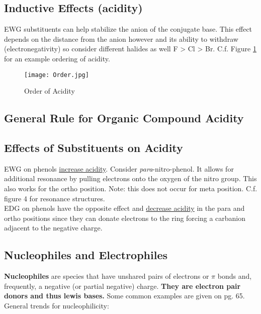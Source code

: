 \documentclass[../OChemReview.tex]{subfiles}
\begin{document}
  \subsection{Inductive Effects (acidity)}

  EWG substituents can help stabilize the anion of the conjugate base. This
  effect depends on the distance from the anion however and its ability to
  withdraw (electronegativity) so consider different halides as well F > Cl >
  Br. C.f. Figure \ref{fig:order} for an example ordering of acidity.
  \begin{figure}[H]
    \centering
    \texttt{[image: Order.jpg]}
    \caption{Order of Acidity}
    \label{fig:order}
  \end{figure}
  

  \subsection{General Rule for Organic Compound Acidity}


  \subsection{Effects of Substituents on Acidity}

  EWG on phenols \underline{increase acidity}. Consider
  \emph{para}-nitro-phenol. It allows for additional resonance by pulling
  electrons onto the oxygen of the nitro group. This also works for the ortho
  position. Note: this does not occur for meta position. C.f. figure 4 for
  resonance structures.\\
  EDG on phenols have the opposite effect and \underline{decrease acidity} in
  the para and ortho positions since they can donate electrons to the ring
  forcing a carbanion adjacent to the negative charge.	

  \subsection{Nucleophiles and Electrophiles}

  \textbf{Nucleophiles} are species that have unshared pairs of electrons or $
  \pi $ bonds and, frequently, a negative (or partial negative) charge.
  \textbf{They are electron pair donors and thus lewis bases.} Some common
  examples are given on pg. 65. General trends for nucleophilicity:
\end{document}
